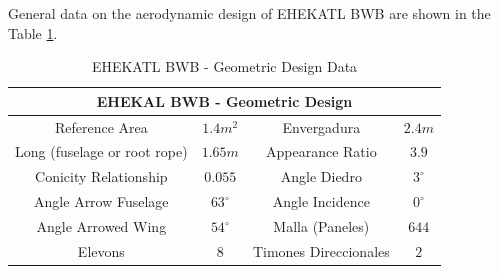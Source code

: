 General data on the aerodynamic design of EHEKATL BWB are shown in the Table \ref{EHEKATL BWB G-33 ficha geometrica}.

\begin{table}[!h]
    \caption{EHEKATL BWB - Geometric Design Data}
    \centering
    \begin{tabular}{|c|c|c|c|}
    \hline
    \multicolumn{4}{|c|}{EHEKAL BWB - Geometric Design}\\
    \hline
    Reference Area &  $1.4 m^2$ & Envergadura & $2.4m$  \\
    Long (fuselage or root rope) & $1.65m$ & Appearance Ratio & $3.9$ \\
    Conicity Relationship & $0.055$ & Angle Diedro & $3^\circ$ \\
    Angle Arrow Fuselage & $63^\circ$ & Angle Incidence & $0^\circ$ \\
    Angle Arrowed Wing & $54^\circ$ & Malla (Paneles) & $644$ \\
    Elevons & $8$ & Timones Direccionales & $2$ \\
    \hline
    \end{tabular}
    \label{EHEKATL BWB G-33 ficha geometrica}
\end{table}

